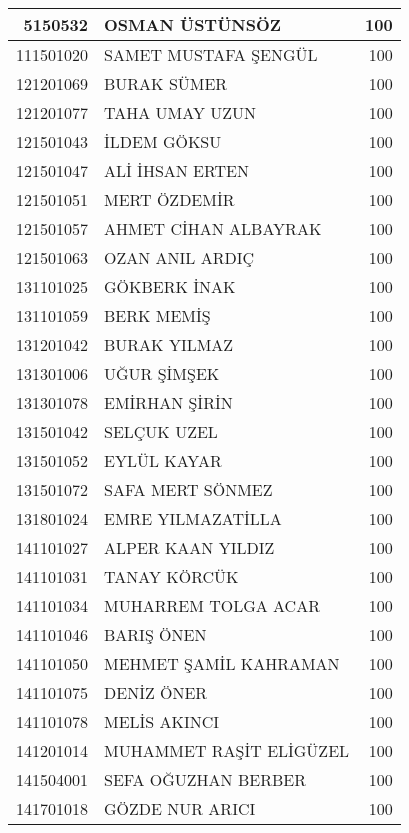 \documentclass[12pt]{article}
\begin{document}
\begin{longtable}{||r||l||r||}
    \midrule
    5150532 & OSMAN ÜSTÜNSÖZ & 100 \\
    \midrule
    111501020 & SAMET MUSTAFA ŞENGÜL & 100 \\
    \midrule
    121201069 & BURAK SÜMER & 100 \\
    \midrule
    121201077 & TAHA UMAY UZUN & 100 \\
    \midrule
    121501043 & İLDEM GÖKSU & 100 \\
    \midrule
    121501047 & ALİ İHSAN ERTEN & 100 \\
    \midrule
    121501051 & MERT ÖZDEMİR & 100 \\
    \midrule
    121501057 & AHMET CİHAN ALBAYRAK & 100 \\
    \midrule
    121501063 & OZAN ANIL ARDIÇ & 100 \\
    \midrule
    131101025 & GÖKBERK İNAK & 100 \\
    \midrule
    131101059 & BERK MEMİŞ & 100 \\
    \midrule
    131201042 & BURAK YILMAZ & 100 \\
    \midrule
    131301006 & UĞUR ŞİMŞEK & 100 \\
    \midrule
    131301078 & EMİRHAN ŞİRİN & 100 \\
    \midrule
    131501042 & SELÇUK UZEL & 100 \\
    \midrule
    131501052 & EYLÜL KAYAR & 100 \\
    \midrule
    131501072 & SAFA MERT SÖNMEZ & 100 \\
    \midrule
    131801024 & EMRE YILMAZATİLLA & 100 \\
    \midrule
    141101027 & ALPER KAAN YILDIZ & 100 \\
    \midrule
    141101031 & TANAY KÖRCÜK & 100 \\
    \midrule
    141101034 & MUHARREM TOLGA ACAR & 100 \\
    \midrule
    141101046 & BARIŞ ÖNEN & 100 \\
    \midrule
    141101050 & MEHMET ŞAMİL KAHRAMAN & 100 \\
    \midrule
    141101075 & DENİZ ÖNER & 100 \\
    \midrule
    141101078 & MELİS AKINCI & 100 \\
    \midrule
    141201014 & MUHAMMET RAŞİT ELİGÜZEL & 100 \\
    \midrule
    141504001 & SEFA OĞUZHAN BERBER & 100 \\
    \midrule
    141701018 & GÖZDE NUR ARICI & 100 \\

\end{longtable}
\end{document}
